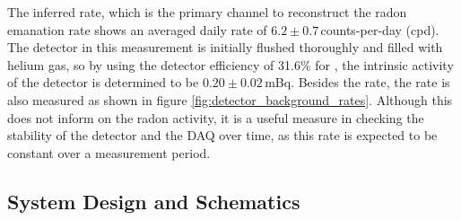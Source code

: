 The inferred \PoTOF{} rate, which is the primary channel to reconstruct the radon emanation rate shows an averaged daily rate of $6.2\pm{}0.7$\,counts-per-day (cpd). The detector in this measurement is initially flushed thoroughly and filled with helium gas, so by using the detector efficiency of 31.6\% for \PoTOF{}, the intrinsic activity of the detector is determined to be $0.20\pm0.02$\,mBq. Besides the \PoTOF{} rate, the \PoTOZ{} rate is also measured as shown in figure \ref{fig:detector_background_rates}. Although this does not inform on the radon activity, it is a useful measure in checking the stability of the detector and the DAQ over time, as this rate is expected to be constant over a measurement period. 

\subsection{System Design and Schematics}
\label{secsec:system_design_schematics}

